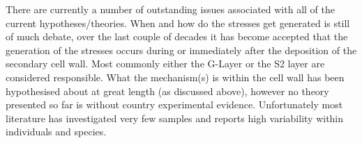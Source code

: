 There are currently a number of outstanding issues associated with all
of the current hypotheses/theories. When and how do the stresses get
generated is still of much debate, over the last couple of decades it has become accepted that the generation of the stresses occurs during or
immediately after the deposition of the secondary cell wall. Most commonly either
the G-Layer or the S2 layer are considered responsible. What the mechanism(s)
is within the cell wall has been hypothesised about at great length (as
discussed above), however no theory presented so far is without country
experimental evidence. Unfortunately most literature has investigated very few samples and reports high
variability within individuals and species.